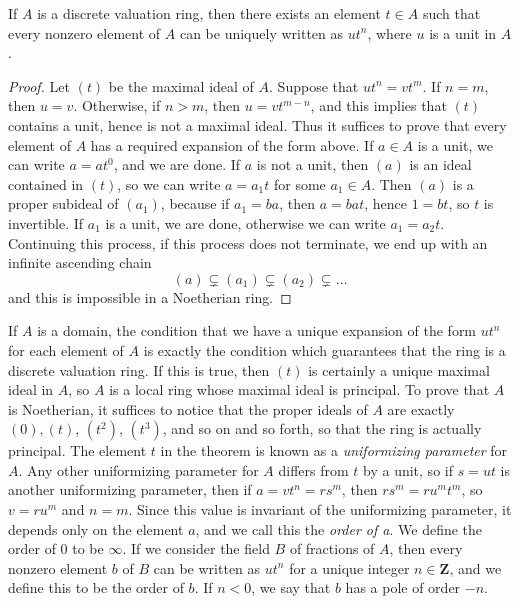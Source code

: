 \begin{prop}
    If $A$ is a discrete valuation ring, then there exists an element $t \in A$ such that every nonzero element of $A$ can be uniquely written as $ut^n$, where $u$ is a unit in $A$.
\end{prop}
\begin{proof}
    Let $(t)$ be the maximal ideal of $A$. Suppose that $ut^n = vt^m$. If $n = m$, then $u = v$. Otherwise, if $n > m$, then $u = vt^{m-n}$, and this implies that $(t)$ contains a unit, hence is not a maximal ideal. Thus it suffices to prove that every element of $A$ has a required expansion of the form above. If $a \in A$ is a unit, we can write $a = at^0$, and we are done. If $a$ is not a unit, then $(a)$ is an ideal contained in $(t)$, so we can write $a = a_1t$ for some $a_1 \in A$. Then $(a)$ is a proper subideal of $(a_1)$, because if $a_1 = ba$, then $a = bat$, hence $1 = bt$, so $t$ is invertible. If $a_1$ is a unit, we are done, otherwise we can write $a_1 = a_2t$. Continuing this process, if this process does not terminate, we end up with an infinite ascending chain
    \[ (a) \subsetneq (a_1) \subsetneq (a_2) \subsetneq \dots \]
    and this is impossible in a Noetherian ring.
\end{proof}

If $A$ is a domain, the condition that we have a unique expansion of the form $ut^n$ for each element of $A$ is exactly the condition which guarantees that the ring is a discrete valuation ring. If this is true, then $(t)$ is certainly a unique maximal ideal in $A$, so $A$ is a local ring whose maximal ideal is principal. To prove that $A$ is Noetherian, it suffices to notice that the proper ideals of $A$ are exactly $(0), (t)$, $(t^2)$, $(t^3)$, and so on and so forth, so that the ring is actually principal. The element $t$ in the theorem is known as a \emph{uniformizing parameter} for $A$. Any other uniformizing parameter for $A$ differs from $t$ by a unit, so if $s = ut$ is another uniformizing parameter, then if $a = vt^n = rs^m$, then $rs^m = ru^mt^m$, so $v = ru^m$ and $n = m$. Since this value is invariant of the uniformizing parameter, it depends only on the element $a$, and we call this the \emph{order of a}. We define the order of $0$ to be $\infty$. If we consider the field $B$ of fractions of $A$, then every nonzero element $b$ of $B$ can be written as $ut^n$ for a unique integer $n \in \mathbf{Z}$, and we define this to be the order of $b$. If $n < 0$, we say that $b$ has a pole of order $-n$.

